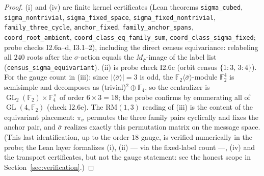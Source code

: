 \documentclass[11pt,a4paper]{article}
\theoremstyle{remark}
\newcommand{\F}{\mathbb F}
\DeclareMathOperator{\GL}{GL}
\begin{document}
\begin{proof}
\sloppy
(i) and (iv) are finite kernel certificates (Lean theorems
\texttt{sigma\_cubed}, \texttt{sigma\_nontrivial},
\texttt{sigma\_fixed\_space}, \texttt{sigma\_fixed\_nontrivial},
\texttt{family\_three\_cycle}, \texttt{anchor\_fixed},
\texttt{family\_anchor\_spans}, \texttt{coord\_root\_ambient},
\texttt{coord\_class\_eq\_family\_sum},
\texttt{coord\_class\_sigma\_fixed}; probe checks I2.6a--d, I3.1--2),
including the direct census equivariance: relabeling all $240$ roots
after the $\sigma$-action equals the $M_{\bar\sigma}$-image of the
label list (\texttt{census\_sigma\_equivariant}).  (ii) is probe
check I2.6c (orbit census $\{1\colon3,\,3\colon4\}$).  For the gauge
count in (iii): since $|\langle\bar\sigma\rangle|=3$ is odd, the
$\F_2\langle\bar\sigma\rangle$-module $\F_2^4$ is semisimple and
decomposes as (trivial)$^2\oplus\F_4$, so the centralizer is
$\GL_2(\F_2)\times\F_4^\times$ of order $6\times3=18$; the probe
confirms by enumerating all of $\GL(4,\F_2)$ (check I2.6e).  The
$\mathrm{RM}(1,3)$ reading of (iii) is the content of the equivariant
placement: $\pi_\sigma$ permutes the three family pairs cyclically
and fixes the anchor pair, and $\bar\sigma$ realizes exactly this
permutation matrix on the message space.  (This last identification,
up to the order-$18$ gauge, is verified numerically in the probe; the
Lean layer formalizes (i), (ii) --- via the fixed-label count ---,
(iv) and the transport certificates, but not the gauge statement:
see the honest scope in Section~\ref{sec:verification}.)
\end{proof}
\end{document}
